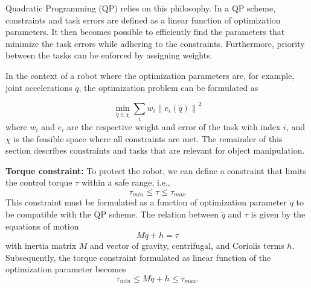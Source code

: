 \documentclass[a4paper, 10pt, conference]{ieeeconf}
\begin{document}
    Quadratic Programming (QP) relies on this philosophy. In a QP scheme, constraints and task errors are defined as a linear function of optimization parameters. It then becomes possible to efficiently find the parameters that minimize the task errors while adhering to the constraints. Furthermore, priority between the tasks can be enforced by assigning weights. 

    In the context of a robot where the optimization parameters are, for example, joint accelerations $\ddot{q}$, the optimization problem can be formulated as

    \begin{equation}
    \min_{\ddot{q}\in\chi}\sum_i w_i \left \| e_i(\ddot{q}) \right \|^2
    \end{equation}
    where $w_i$ and $e_i$ are the respective weight and error of the task with index $i$, and $\chi$ is the feasible space where all constraints are met. The remainder of this section describes constraints and tasks that are relevant for object manipulation.

    \textbf{Torque constraint:} To protect the robot, we can define a constraint that limits the control torque $\tau$ within a safe range, i.e.,
    \begin{equation}
    \tau_{min} \leq\tau \leq  \tau_{max} 
    \end{equation}
    This constraint must be formulated as a function of optimization parameter $\ddot q$ to be compatible with the QP scheme. The relation between $\ddot{q}$ and $\tau$ is given by the equations of motion
    \begin{equation}
    M\ddot{q}+h=\tau
    \end{equation}    
    with inertia matrix $M$ and vector of gravity, centrifugal, and Coriolis terms $h$. Subsequently, the torque constraint formulated as linear function of the optimization parameter becomes
    \begin{equation}\label{eq:eom}
    \tau_{min} \leq M\ddot{q}+h \leq  \tau_{max}.       
    \end{equation} 
\end{document}
